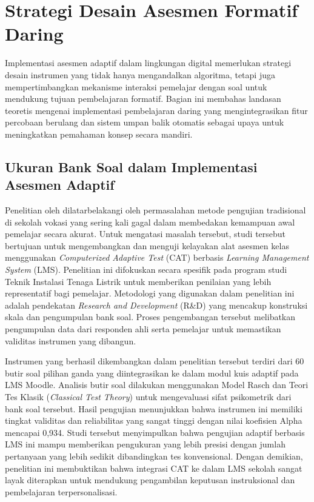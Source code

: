 
\section{Strategi Desain Asesmen Formatif Daring}
\label{sec:strategi_asesmen_formatif}

Implementasi asesmen adaptif dalam lingkungan digital memerlukan strategi desain instrumen yang tidak hanya mengandalkan algoritma, tetapi juga mempertimbangkan mekanisme interaksi pemelajar dengan soal untuk mendukung tujuan pembelajaran formatif. Bagian ini membahas landasan teoretis mengenai implementasi pembelajaran daring yang mengintegrasikan fitur percobaan berulang dan sistem umpan balik otomatis sebagai upaya untuk meningkatkan pemahaman konsep secara mandiri.

\subsection{Ukuran Bank Soal dalam Implementasi Asesmen Adaptif}
\label{ssec:ukuran_bank_soal}

Penelitian oleh \textcite{Hadi2022} dilatarbelakangi oleh permasalahan metode pengujian tradisional di sekolah vokasi yang sering kali gagal dalam membedakan kemampuan awal pemelajar secara akurat. Untuk mengatasi masalah tersebut, studi tersebut bertujuan untuk mengembangkan dan menguji kelayakan alat asesmen kelas menggunakan \textit{Computerized Adaptive Test} (CAT) berbasis \textit{Learning Management System} (LMS). Penelitian ini difokuskan secara spesifik pada program studi Teknik Instalasi Tenaga Listrik untuk memberikan penilaian yang lebih representatif bagi pemelajar. Metodologi yang digunakan dalam penelitian ini adalah pendekatan \textit{Research and Development} (R\&D) yang mencakup konstruksi skala dan pengumpulan bank soal. Proses pengembangan tersebut melibatkan pengumpulan data dari responden ahli serta pemelajar untuk memastikan validitas instrumen yang dibangun.

Instrumen yang berhasil dikembangkan dalam penelitian \textcite{Hadi2022} tersebut terdiri dari 60 butir soal pilihan ganda yang diintegrasikan ke dalam modul kuis adaptif pada LMS Moodle. Analisis butir soal dilakukan menggunakan Model Rasch dan Teori Tes Klasik (\textit{Classical Test Theory}) untuk mengevaluasi sifat psikometrik dari bank soal tersebut. Hasil pengujian menunjukkan bahwa instrumen ini memiliki tingkat validitas dan reliabilitas yang sangat tinggi dengan nilai koefisien Alpha mencapai 0,934. Studi tersebut menyimpulkan bahwa pengujian adaptif berbasis LMS ini mampu memberikan pengukuran yang lebih presisi dengan jumlah pertanyaan yang lebih sedikit dibandingkan tes konvensional. Dengan demikian, penelitian ini membuktikan bahwa integrasi CAT ke dalam LMS sekolah sangat layak diterapkan untuk mendukung pengambilan keputusan instruksional dan pembelajaran terpersonalisasi.


